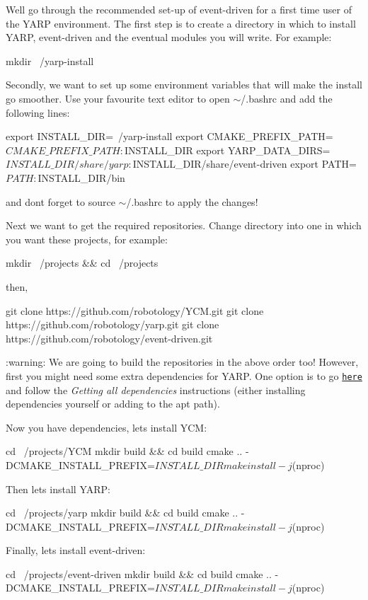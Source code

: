 We\textquotesingle{}ll go through the recommended set-\/up of {\ttfamily event-\/driven} for a first time user of the {\ttfamily Y\+A\+RP} environment. The first step is to create a directory in which to install {\ttfamily Y\+A\+RP}, {\ttfamily event-\/driven} and the eventual modules you will write. For example\+: 
\begin{DoxyCode}
mkdir ~/yarp-install
\end{DoxyCode}
 Secondly, we want to set up some environment variables that will make the install go smoother. Use your favourite text editor to open {\ttfamily $\sim$/.bashrc} and add the following lines\+: 
\begin{DoxyCode}
export INSTALL\_DIR=~/yarp-install
export CMAKE\_PREFIX\_PATH=$CMAKE\_PREFIX\_PATH:$INSTALL\_DIR
export YARP\_DATA\_DIRS=$INSTALL\_DIR/share/yarp:$INSTALL\_DIR/share/event-driven
export PATH=$PATH:$INSTALL\_DIR/bin
\end{DoxyCode}
 and don\textquotesingle{}t forget to {\ttfamily source $\sim$/.bashrc} to apply the changes!

Next we want to get the required repositories. Change directory into one in which you want these projects, for example\+: 
\begin{DoxyCode}
mkdir ~/projects && cd ~/projects
\end{DoxyCode}
 then, 
\begin{DoxyCode}
git clone https://github.com/robotology/YCM.git
git clone https://github.com/robotology/yarp.git
git clone https://github.com/robotology/event-driven.git
\end{DoxyCode}
 \+:warning\+: We are going to build the repositories in the above order too! However, first you might need some extra dependencies for {\ttfamily Y\+A\+RP}. One option is to go \href{http://wiki.icub.org/wiki/Linux:Installation_from_sources}{\tt here} and follow the {\itshape Getting all dependencies} instructions (either installing dependencies yourself or adding to the {\ttfamily apt} path).

Now you have dependencies, let\textquotesingle{}s install {\ttfamily Y\+CM}\+: 
\begin{DoxyCode}
cd ~/projects/YCM
mkdir build && cd build
cmake .. -DCMAKE\_INSTALL\_PREFIX=$INSTALL\_DIR
make install -j$(nproc)
\end{DoxyCode}


Then let\textquotesingle{}s install {\ttfamily Y\+A\+RP}\+: 
\begin{DoxyCode}
cd ~/projects/yarp
mkdir build && cd build
cmake .. -DCMAKE\_INSTALL\_PREFIX=$INSTALL\_DIR
make install -j$(nproc)
\end{DoxyCode}
 Finally, let\textquotesingle{}s install {\ttfamily event-\/driven}\+: 
\begin{DoxyCode}
cd ~/projects/event-driven
mkdir build && cd build
cmake .. -DCMAKE\_INSTALL\_PREFIX=$INSTALL\_DIR
make install -j$(nproc)
\end{DoxyCode}


